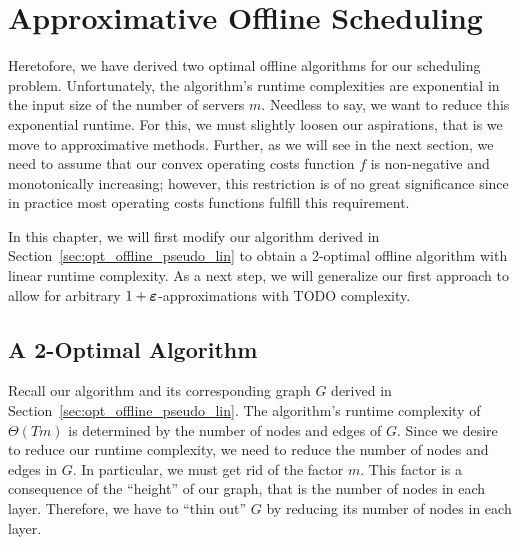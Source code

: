 
\chapter{Approximative Offline Scheduling}\label{chap:approx_offline_scheduling}
Heretofore, we have derived two optimal offline algorithms for our scheduling problem. Unfortunately, the algorithm's runtime complexities are exponential in the input size of the number of servers $m$. Needless to say, we want to reduce this exponential runtime. For this, we must slightly loosen our aspirations, that is we move to approximative methods. Further, as we will see in the next section, we need to assume that our convex operating costs function $f$ is non-negative and monotonically increasing; however, this restriction is of no great significance since in practice most operating costs functions fulfill this requirement. 

In this chapter, we will first modify our algorithm derived in Section~\ref{sec:opt_offline_pseudo_lin} to obtain a 2-optimal offline algorithm with linear runtime complexity. As a next step, we will generalize our first approach to allow for arbitrary $1+\boldsymbol\varepsilon$-approximations with TODO complexity.

\section{A 2-Optimal Algorithm}
Recall our algorithm and its corresponding graph $G$ derived in Section~\ref{sec:opt_offline_pseudo_lin}. The algorithm's runtime complexity of $\Theta(Tm)$ is determined by the number of nodes and edges of $G$. Since we desire to reduce our runtime complexity, we need to reduce the number of nodes and edges in $G$. In particular, we must get rid of the factor $m$. This factor is a consequence of the ``height'' of our graph, that is the number of nodes in each layer. Therefore, we have to ``thin out'' $G$ by reducing its number of nodes in each layer.

